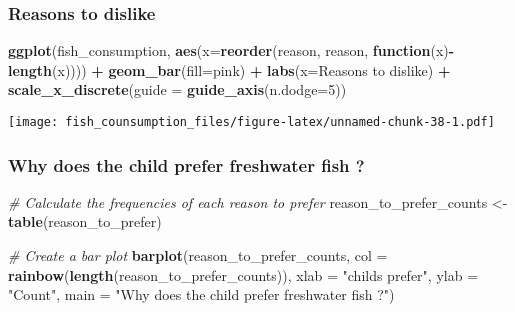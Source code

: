 \documentclass[
]{article}
\newenvironment{Shaded}{\begin{snugshade}}{\end{snugshade}}
\newcommand{\AttributeTok}[1]{\textcolor[rgb]{0.13,0.29,0.53}{#1}}
\newcommand{\CommentTok}[1]{\textcolor[rgb]{0.56,0.35,0.01}{\textit{#1}}}
\newcommand{\ControlFlowTok}[1]{\textcolor[rgb]{0.13,0.29,0.53}{\textbf{#1}}}
\newcommand{\DecValTok}[1]{\textcolor[rgb]{0.00,0.00,0.81}{#1}}
\newcommand{\FunctionTok}[1]{\textcolor[rgb]{0.13,0.29,0.53}{\textbf{#1}}}
\newcommand{\NormalTok}[1]{#1}
\newcommand{\OtherTok}[1]{\textcolor[rgb]{0.56,0.35,0.01}{#1}}
\newcommand{\SpecialCharTok}[1]{\textcolor[rgb]{0.81,0.36,0.00}{\textbf{#1}}}
\newcommand{\StringTok}[1]{\textcolor[rgb]{0.31,0.60,0.02}{#1}}
\begin{document}
\hypertarget{reasons-to-dislike}{%
\subsubsection{Reasons to dislike}\label{reasons-to-dislike}}

\begin{Shaded}
\begin{Highlighting}[]
\FunctionTok{ggplot}\NormalTok{(fish\_consumption, }\FunctionTok{aes}\NormalTok{(}\AttributeTok{x=}\FunctionTok{reorder}\NormalTok{(reason, reason, }\ControlFlowTok{function}\NormalTok{(x)}\SpecialCharTok{{-}}\FunctionTok{length}\NormalTok{(x)))) }\SpecialCharTok{+}
  \FunctionTok{geom\_bar}\NormalTok{(}\AttributeTok{fill=}\StringTok{\textquotesingle{}pink\textquotesingle{}}\NormalTok{) }\SpecialCharTok{+} 
  \FunctionTok{labs}\NormalTok{(}\AttributeTok{x=}\StringTok{\textquotesingle{}Reasons to dislike\textquotesingle{}}\NormalTok{) }\SpecialCharTok{+}
  \FunctionTok{scale\_x\_discrete}\NormalTok{(}\AttributeTok{guide =} \FunctionTok{guide\_axis}\NormalTok{(}\AttributeTok{n.dodge=}\DecValTok{5}\NormalTok{))}
\end{Highlighting}
\end{Shaded}

\texttt{[image: fish\_counsumption\_files/figure-latex/unnamed-chunk-38-1.pdf]}

\hypertarget{why-does-the-child-prefer-freshwater-fish}{%
\subsubsection{Why does the child prefer freshwater fish
?}\label{why-does-the-child-prefer-freshwater-fish}}

\begin{Shaded}
\begin{Highlighting}[]
\CommentTok{\# Calculate the frequencies of each reason to prefer}
\NormalTok{reason\_to\_prefer\_counts }\OtherTok{\textless{}{-}} \FunctionTok{table}\NormalTok{(reason\_to\_prefer)}

\CommentTok{\# Create a bar plot}
\FunctionTok{barplot}\NormalTok{(reason\_to\_prefer\_counts, }\AttributeTok{col =} \FunctionTok{rainbow}\NormalTok{(}\FunctionTok{length}\NormalTok{(reason\_to\_prefer\_counts)), }
        \AttributeTok{xlab =} \StringTok{"child\textquotesingle{}s prefer"}\NormalTok{, }\AttributeTok{ylab =} \StringTok{"Count"}\NormalTok{, }\AttributeTok{main =} \StringTok{"Why does the child prefer freshwater fish ?"}\NormalTok{)}
\end{Highlighting}
\end{Shaded}
\end{document}
